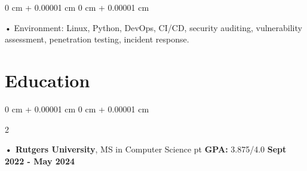 \documentclass[10pt, letterpaper]{article}
\newenvironment{onecolentry}{
    \begin{adjustwidth}{
        0 cm + 0.00001 cm
    }{
        0 cm + 0.00001 cm
    }
}{
    \end{adjustwidth}
} %
\newenvironment{twocolentry}[2][]{
    \onecolentry
    \def\secondColumn{#2}
    \setcolumnwidth{\fill, 4.5 cm}
    \begin{paracol}{2}
}{
    \switchcolumn \raggedleft \secondColumn
    \end{paracol}
    \endonecolentry
} %
\begin{document}
        \begin{onecolentry}
             • Environment: Linux, Python, DevOps, CI/CD, security auditing, vulnerability assessment, penetration testing, incident response.
        \end{onecolentry}
    \vspace{2 pt }
        \section{Education}
        \vspace{2 pt }
        \begin{twocolentry}{
            \textbf{Sept 2022 - May 2024}
        }
            \textbf{ • Rutgers University}, MS in Computer Science  pt \textbf{GPA:} 3.875/4.0  \end{twocolentry}
\end{document}
